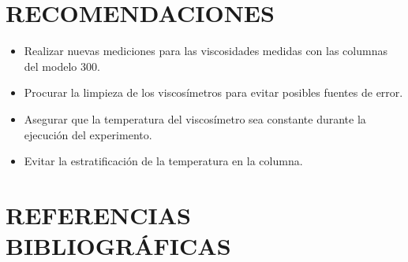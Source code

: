 \documentclass[12, letterpaper]{article}
\begin{document}
\section{RECOMENDACIONES}

\begin{itemize}
    \item Realizar nuevas mediciones para las viscosidades medidas con las columnas del modelo 300.
    \item Procurar la limpieza de los viscosímetros para evitar posibles fuentes de error.
    \item Asegurar que la temperatura del viscosímetro sea constante durante la ejecución del experimento.
    \item Evitar la estratificación de la temperatura en la columna.
\end{itemize}

\section{REFERENCIAS BIBLIOGRÁFICAS}

\printbibliography

\end{document}
